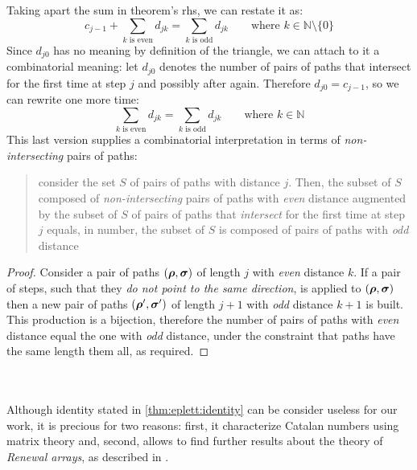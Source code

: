 Taking apart the sum in theorem's \ac{rhs}, we can restate it as:
\begin{displaymath}                
    c_{j-1} + \sum_{{k \text{ is even}}}{d_{jk}}
        = \sum_{{k \text{ is odd}}}{d_{jk}}\qquad\text{where } k\in\mathbb{N}\setminus \lbrace0\rbrace
\end{displaymath}
Since $d_{j0}$ has no meaning by definition of the triangle, we can
attach to it a combinatorial meaning: let $d_{j0}$ denotes the
number of pairs of paths that intersect for the first time at
step $j$ and possibly after again. Therefore $d_{j0}=c_{j-1}$, so 
we can rewrite one more time:
\begin{displaymath}                
    \sum_{{k \text{ is even}}}{d_{jk}}
        = \sum_{{k \text{ is odd}}}{d_{jk}} \qquad\text{where } k\in\mathbb{N}
\end{displaymath}
This last version supplies a combinatorial 
interpretation in terms of \emph{non-intersecting} pairs of paths:
\begin{quote}
    consider the set $S$ of pairs of paths with distance $j$. Then,
    the subset of $S$ composed of \emph{non-intersecting} pairs of paths 
    with \emph{even} distance augmented by the subset of $S$ of 
    pairs of paths that \emph{intersect} for the first time at step $j$
    equals, in number, the subset of $S$ is composed of pairs of paths 
    with \emph{odd} distance
\end{quote}
\begin{proof}
    Consider a pair of paths $(\boldsymbol{\rho},\boldsymbol{\sigma})$ of length $j$ with
    \emph{even} distance $k$.  If a pair of steps, such that they \emph{do not
    point to the same direction}, is applied to $(\boldsymbol{\rho},\boldsymbol{\sigma})$
    then a new pair of paths $(\boldsymbol{\rho}^{\prime},\boldsymbol{\sigma}^{\prime})$ of
    length $j+1$ with \emph{odd} distance $k+1$ is built. This production is a
    bijection, therefore the number of pairs of paths with \emph{even} distance
    equal the one with \emph{odd} distance, under the constraint that paths
    have the same length them all, as required.
\end{proof}
\quad\\\\
Although identity stated in \autoref{thm:eplett:identity} can be consider
useless for our work, it is precious for two reasons: first, it characterize
Catalan numbers using matrix theory and, second, allows
\citeauthor{rogers:eplett:identity} to find further results about the theory of
\emph{Renewal arrays}, as described in \cite{rogers:eplett:identity}.


















